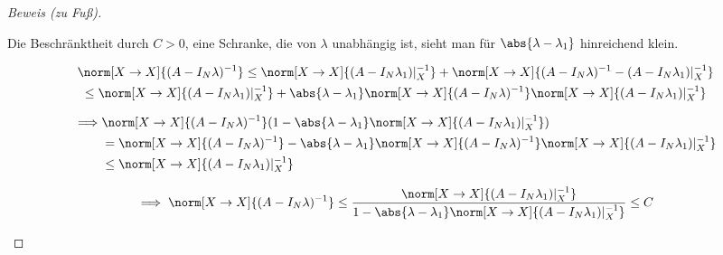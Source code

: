 \begin{proof}[Beweis (zu Fuß)]
\begin{enumerate}[label = (\roman*)]
        Die Beschränktheit durch $C > 0$, eine Schranke, die von $\lambda$ unabhängig ist, sieht man für $\abs{\lambda - \lambda_1}$ hinreichend klein.

        \begin{multline*}
            \norm[X \to X]{(A - I_N \lambda)^{-1}}
            \leq
            \norm[X \to X]{(A - I_N \lambda_1) |_X^{-1}}
            +
            \norm[X \to X]
            {
                (A - I_N \lambda)^{-1}
                -
                (A - I_N \lambda_1) |_X^{-1}
            } \\
            \leq
            \norm[X \to X]{(A - I_N \lambda_1) |_X^{-1}}
            +
            \abs{\lambda - \lambda_1}
            \norm[X \to X]{(A - I_N \lambda)^{-1}}
            \norm[X \to X]{(A - I_N \lambda_1) |_X^{-1}}           
        \end{multline*}

        \begin{align*}
            \implies
            &
            \norm[X \to X]{(A - I_N \lambda)^{-1}}
            (
                1
                -
                \abs{\lambda - \lambda_1}
                \norm[X \to X]{(A - I_N \lambda_1) |_X^{-1}}
            ) \\
            & =
            \norm[X \to X]{(A - I_N \lambda)^{-1}}
            -
            \abs{\lambda - \lambda_1}
            \norm[X \to X]{(A - I_N \lambda)^{-1}}
            \norm[X \to X]{(A - I_N \lambda_1) |_X^{-1}} \\
            & \leq
            \norm[X \to X]{(A - I_N \lambda_1) |_X^{-1}}
        \end{align*}

        \begin{align*}
            \implies
            \norm[X \to X]{(A - I_N \lambda)^{-1}}
            \leq
            \frac
            {
                \norm[X \to X]{(A - I_N \lambda_1) |_X^{-1}}
            }{
                1
                -
                \abs{\lambda - \lambda_1}
                \norm[X \to X]{(A - I_N \lambda_1) |_X^{-1}}
            }
            \leq
            C
        \end{align*}

    \end{enumerate}

\end{proof}

